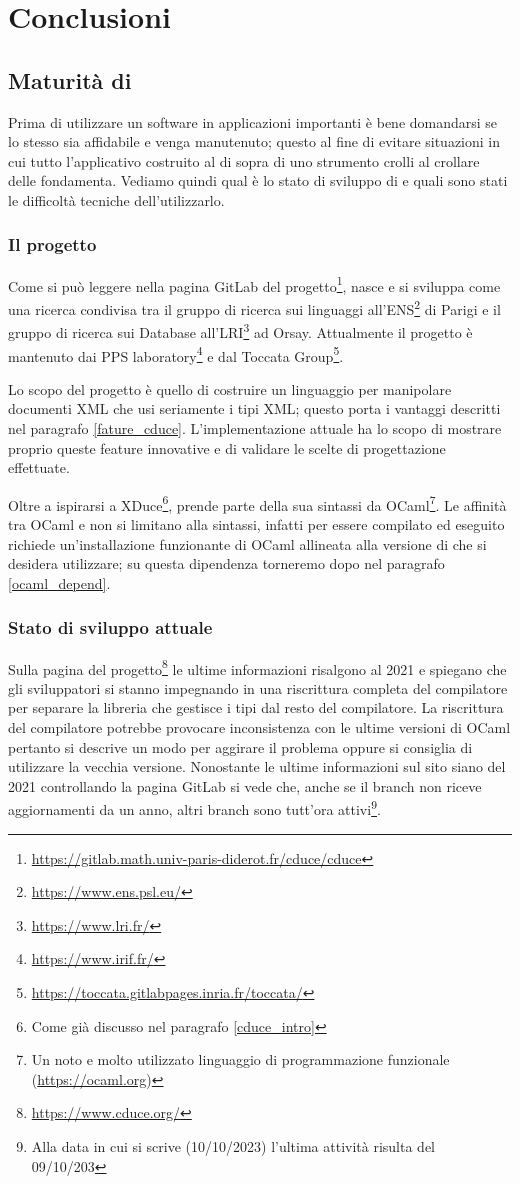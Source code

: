 \chapter{Conclusioni}
\section{Maturità di \cduce}
Prima di utilizzare un software in applicazioni importanti è bene domandarsi se lo stesso sia affidabile e venga manutenuto; questo al fine di evitare situazioni in cui tutto l'applicativo costruito al di sopra di uno strumento crolli al crollare delle fondamenta. Vediamo quindi qual è lo stato di sviluppo di \cduce e quali sono stati le difficoltà tecniche dell'utilizzarlo.
\subsection{Il progetto \cduce}
Come si può leggere nella pagina GitLab del progetto\footnote{\url{https://gitlab.math.univ-paris-diderot.fr/cduce/cduce}}, \cduce nasce e si sviluppa come una ricerca condivisa tra il gruppo di ricerca sui linguaggi all'ENS\footnote{\url{https://www.ens.psl.eu/}} di Parigi e il gruppo di ricerca sui Database all'LRI\footnote{\url{https://www.lri.fr/}} ad Orsay. Attualmente il progetto è mantenuto dai PPS laboratory\footnote{\url{https://www.irif.fr/}} e dal  Toccata Group\footnote{\url{https://toccata.gitlabpages.inria.fr/toccata/}}.

Lo scopo del progetto è quello di costruire un linguaggio per manipolare documenti XML che usi seriamente i tipi XML; questo porta i vantaggi descritti nel paragrafo \ref{fature_cduce}. L'implementazione attuale ha lo scopo di mostrare proprio queste feature innovative e di validare le scelte di progettazione effettuate.

Oltre a ispirarsi a XDuce\footnote{Come già discusso nel paragrafo \ref{cduce_intro}}, \cduce prende parte della sua sintassi da OCaml\footnote{Un noto e molto utilizzato linguaggio di programmazione funzionale (\url{https://ocaml.org})}. Le affinità tra OCaml e \cduce non si limitano alla sintassi, infatti per essere compilato ed eseguito \cduce richiede un'installazione funzionante di OCaml allineata alla versione di \cduce che si desidera utilizzare; su questa dipendenza torneremo dopo nel paragrafo \ref{ocaml_depend}.
\subsection{Stato di sviluppo attuale}
Sulla pagina del progetto\footnote{\url{https://www.cduce.org/}} le ultime informazioni risalgono al 2021 e spiegano che gli sviluppatori si stanno impegnando in una riscrittura completa del compilatore per separare la libreria che gestisce i tipi dal resto del compilatore. La riscrittura del compilatore potrebbe provocare inconsistenza con le ultime versioni di OCaml pertanto si descrive un modo per aggirare il problema oppure si consiglia di utilizzare la vecchia versione. Nonostante le ultime informazioni sul sito siano del 2021 controllando la pagina GitLab si vede che, anche se il branch  non riceve aggiornamenti da un anno, altri branch sono tutt'ora attivi\footnote{Alla data in cui si scrive (10/10/2023) l'ultima attività risulta del 09/10/203}.
